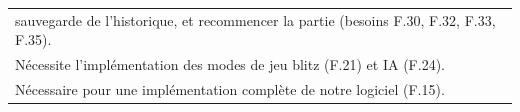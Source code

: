 \documentclass[a4paper,12pt]{article}
\begin{document}
\begin{tabularx}{\textwidth}{|X|}
    sauvegarde de l’historique, et recommencer la partie (besoins F.30, F.32, F.33,
    F.35).                                                                                                                                                                                                                                      \\ Nécessite l’implémentation des modes de jeu blitz (F.21) et IA
    (F.24).                                                                                                                                                                                                                                     \\ Nécessaire pour une implémentation complète de notre logiciel
    (F.15).                                                                                                                                                                                                                                     \\ \hline
\end{tabularx}

\vspace{1cm}
\end{document}
